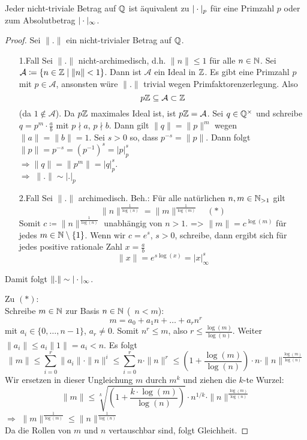 \documentclass[../main.tex]{subfiles}
\begin{document}
\begin{theorem}
    Jeder nicht-triviale Betrag auf $\mathbb{Q}$ ist äquivalent zu $|\cdot|_p$ für eine Primzahl $p$ oder zum Absolutbetrag $|\cdot|_\infty$.
\end{theorem}
\begin{proof}
    Sei $\|.\|$ ein nicht-trivialer Betrag auf $\mathbb{Q}$.
    \begin{itemize}
        \item[1.Fall]
        Sei $\|.\|$ nicht-archimedisch, d.h. $\|n\|\leq 1$ für alle $n\in \mathbb{N}$.
        Sei $\mathcal{A}\coloneqq \{n\in \mathbb{Z}\mid \|n\| <1\}$.
        Dann ist $\mathcal{A}$ ein Ideal in $\mathbb{Z}$.
        Es gibt eine Primzahl $p$ mit $p\in \mathcal{A}$, ansonsten würe $\|.\|$ trivial wegen Primfaktorenzerlegung. Also
        $$p\mathbb{Z}\subseteq\mathcal{A}\subset \mathbb{Z}$$ (da $1\notin \mathcal{A}$).
        Da $p\mathbb{Z}$ maximales Ideal ist, ist $p\mathbb{Z} = \mathcal{A}$.
        Sei $q\in \mathbb{Q}^\times$ und schreibe $q=p^m\cdot \frac{a}{b}$ mit $p\nmid a$, $p\nmid b$.
        Dann gilt $\|q\| = \|p\|^m$ wegen $\|a\| = \|b\| =1$.
        Sei $s>0$ so, dass $p^{-s} = \|p\|$.
        Dann folgt $\|p\| =p^{-s} = (p^{-1})^s= |p|_p^s$\\
        $\Longrightarrow\|q\| = \|p^m\| = |q|_p^s$.\\
        $\Longrightarrow\;\|.\| \sim |.|_p$

        \item[2.Fall]
        Sei $\|.\|$ archimedisch.
        Beh.: Für alle natürlichen $n,m\in\mathbb{N}_{>1}$ gilt
        $$\|n\|^{\frac{1}{\log(n)}} = \|m\|^{\frac{1}{\log(m)}}\quad (*)$$
        Somit $c\coloneqq\|n\|^{\frac{1}{\log(n)}}$ unabhängig von $n>1$.
        => $\|m\| = c^{\log(m)}$ für jedes $m\in \mathbb{N}\setminus\{1\}$.
        Wenn wir $c = e^s$, $s>0$, schreibe, dann ergibt sich für jedes positive rationale Zahl $x=\frac{a}{b}$
        $$\|x\| = e^{s\log(x)} = |x|_\infty^s$$
    \end{itemize}
    Damit folgt $\|.\|\sim |\cdot|_\infty$.

    Zu $(*)$:\\
    Schreibe $m\in \mathbb{N}$ zur Basis $n\in\mathbb{N}$ (\obda\ $n<m$):
    $$m= a_0 + a_1 n+\dots+a_rn^r$$
    mit $a_i\in \{0,\dots,n-1\}$, $a_r \neq 0$.
    Somit $n^r\leq m$, also $r\leq \frac{\log(m)}{\log(n)}$.
    Weiter $\|a_i\| \leq a_i \|1\| = a_i<n$.
    Es folgt $$\|m\|\leq \sum_{i=0}^r \|a_i\| \cdot \|n\|^i\leq \sum_{i=0}^r n \cdot \|n\|^r \leq \left(1+\frac{\log(m)}{\log(n)}\right) \cdot n \cdot \|n\|^{\frac{\log(m)}{\log(n)}}$$
    Wir ersetzen in dieser Ungleichung $m$ durch $m^k$ und ziehen die $k$-te Wurzel:
    $$\|m\| \leq \sqrt[k]{\left(1+\frac{k\cdot\log(m)}{\log(n)}\right)}\cdot n^{1/k} \cdot \|n\|^{\frac{\log(m)}{\log(n)}}$$
    $\Longrightarrow$ $\|m\|^{\frac{1}{\log(m)}} \leq \|n\|^{\frac{1}{\log(n)}}$\\
    Da die Rollen von $m$ und $n$ vertauschbar sind, folgt Gleichheit.
\end{proof}
\end{document}
